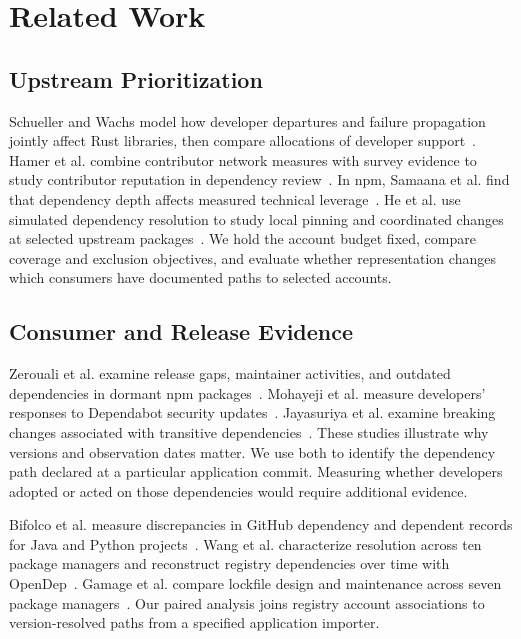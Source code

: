 \section{Related Work}
\label{sec:related_work}

\subsection{Upstream Prioritization}
Schueller and Wachs model how developer departures and failure propagation jointly affect Rust libraries, then compare allocations of developer support~\cite{schueller2024}. Hamer et al. combine contributor network measures with survey evidence to study contributor reputation in dependency review~\cite{hamer2025trust}. In npm, Samaana et al. find that dependency depth affects measured technical leverage~\cite{samaana2025}. He et al. use simulated dependency resolution to study local pinning and coordinated changes at selected upstream packages~\cite{he2025}. We hold the account budget fixed, compare coverage and exclusion objectives, and evaluate whether representation changes which consumers have documented paths to selected accounts.

\subsection{Consumer and Release Evidence}
Zerouali et al. examine release gaps, maintainer activities, and outdated dependencies in dormant npm packages~\cite{zerouali2026dormant}. Mohayeji et al. measure developers' responses to Dependabot security updates~\cite{mohayeji2025}. Jayasuriya et al. examine breaking changes associated with transitive dependencies~\cite{jayasuriya2024}. These studies illustrate why versions and observation dates matter. We use both to identify the dependency path declared at a particular application commit. Measuring whether developers adopted or acted on those dependencies would require additional evidence.

Bifolco et al. measure discrepancies in GitHub dependency and dependent records for Java and Python projects~\cite{bifolco2025accuracy}. Wang et al. characterize resolution across ten package managers and reconstruct registry dependencies over time with OpenDep~\cite{wang2026opendep}. Gamage et al. compare lockfile design and maintenance across seven package managers~\cite{gamage2026lockfiles}. Our paired analysis joins registry account associations to version-resolved paths from a specified application importer.

